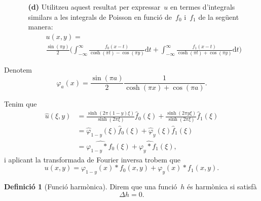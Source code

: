 \documentclass[a4paper]{article}
\theoremstyle{plain}
\theoremstyle{definition}
\newtheorem{definition}{Definició}
\providecommand{\uppi}{\pi}
\newcommand{\diff}{\mathrm{d}}
\newcommand{\conv}{\mathop{\ast}}
\begin{document}
\begin{enumerate}
    \item[]\begin{enumerate}
        \item[\textbf{(d)}] Utilitzeu aquest resultat per expressar~\(u\) en
            termes d'integrals similars a les integrals de Poisson en funció
            de~\(f_{0}\) i~\(f_{1}\) de la següent manera:
            \begin{multline*}
                u(x,y)
                = \\
                \frac{\sin(\uppi y)}{2}
                \biggl(
                    \int_{-\infty}^{\infty}
                    \frac{f_{0}(x-t)}{\cosh(\uppi t)-\cos(\uppi y)}
                    \diff t
                    +
                    \int_{-\infty}^{\infty}
                    \frac{f_{1}(x-t)}{\cosh(\uppi t)+\cos(\uppi y)}
                    \diff t
                \biggr)
            \end{multline*}
    \end{enumerate}
\end{enumerate}

Denotem
\[
    \varphi_{a}(x)
    =
    \frac{\sin(\uppi a)}{2}
    \frac{1}{\cosh(\uppi x) + \cos(\uppi a)}.
\]

Tenim que
\begin{align*}
    \widehat{u}(\xi,y) &= \frac{\sinh(2\uppi(1-y)\xi)}{\sinh(2\uppi\xi)}
                          \widehat{f}_{0}(\xi)
                          +
                          \frac{\sinh(2\uppi y\xi)}{\sinh(2\uppi\xi)}
                          \widehat{f}_{1}(\xi) \\
                       &= \widehat{\varphi}_{1-y}(\xi)
                          \widehat{f}_{0}(\xi)
                          +
                          \widehat{\varphi}_{y}(\xi)
                          \widehat{f}_{1}(\xi) \\
                       &= \widehat{\varphi_{1-y}\conv f_{0}}(\xi)
                          +
                          \widehat{\varphi_{y}\conv f_{1}}(\xi),
\end{align*}
i aplicant la transformada de Fourier inversa trobem que
\[
    u(x,y)
    =
    \varphi_{1-y}(x)\conv f_{0}(x,y)
    +
    \varphi_{y}(x)\conv f_{1}(x,y).
\]

\begin{definition}[Funció harmònica]
    Direm que una funció~\(h\) és harmònica si satisfà
    \[
        \Delta h = 0.
    \]
\end{definition}
\end{document}
